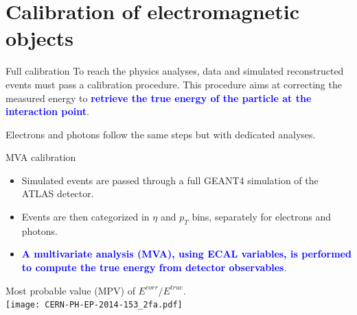 \section{Calibration of electromagnetic objects}
\frame{\tableofcontents[currentsection]}
\begin{frame}{Full calibration}
  To reach the physics analyses, data and simulated reconstructed events must pass a calibration procedure.
  This procedure aims at correcting the measured energy to \textcolor{blue}{\bf retrieve the true energy of the particle at the interaction point}.
  \begin{center}
  \end{center}
  Electrons and photons follow the same steps but with dedicated analyses. 
\end{frame}
\begin{frame}{MVA calibration}
\begin{itemize}
\item Simulated events are passed through a full GEANT4 simulation of the ATLAS detector.
\item Events are then categorized in $\eta$ and $p_T$ bins, separately for electrons and photons.
\item \textcolor{blue}{\bf A multivariate analysis (MVA), using ECAL variables, is performed to compute the true energy from detector observables}.
\end{itemize}

\begin{center}
  Most probable value (MPV) of $E^{corr}/E^{true}$.\\
  \texttt{[image: CERN-PH-EP-2014-153\_2fa.pdf]}
\end{center}

\end{frame}
